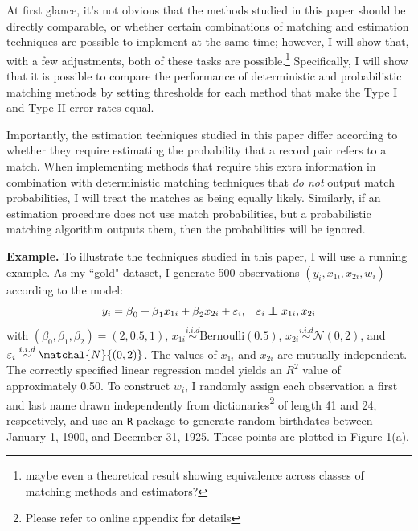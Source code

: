 \documentclass[12pt]{article}
\newcommand\independent{\protect\mathpalette{\protect\independenT}{\perp}}
\def\independenT#1#2{\mathrel{\rlap{$#1#2$}\mkern2mu{#1#2}}}
\begin{document}
At first glance, it's not obvious that the methods studied in this paper should be directly comparable, or whether certain combinations of matching and estimation techniques are possible to implement at the same time; however, I will show that, with a few adjustments, both of these tasks are possible.\footnote{maybe even a theoretical result showing equivalence across classes of matching methods and estimators?}   Specifically, I will show that it is possible to compare the performance of deterministic and probabilistic matching methods by setting thresholds for each method that make the Type I and Type II error rates equal. 

Importantly, the estimation techniques studied in this paper differ according to whether they require estimating the probability that a record pair refers to a match.  When implementing methods that require this extra information in combination with deterministic matching techniques that \textit{do not} output match probabilities, I will treat the matches as being equally likely.  Similarly, if an estimation procedure does not use match probabilities, but a probabilistic matching algorithm outputs them, then the probabilities will be ignored.  

\textbf{Example.} To illustrate the techniques studied in this paper, I will use a running example.  As my ``gold" dataset, I generate 500 observations $(y_i, x_{1i}, x_{2i}, w_i)$ according to the model:
\begin{equation}
y_i = \beta_0 + \beta_1 x_{1i} + \beta_2 x_{2i} + \varepsilon_i , \hspace{5pt} \  \varepsilon_i \independent x_{1i}, x_{2i} 
\end{equation}
with $(\beta_0, \beta_1, \beta_2) = (2, 0.5, 1)$, $x_{1i} \overset{i.i.d}{\sim} \text{Bernoulli}(0.5)$, $x_{2i} \overset{i.i.d}{\sim} \mathcal{N}(0, 2)$, and $\varepsilon_i \overset{i.i.d}{\sim} \matchal{N}{(0, 2)}$.   The values of $x_{1i}$ and $x_{2i}$ are mutually independent.   The correctly specified linear regression model yields an $R^2$ value of approximately 0.50.  
To construct $w_i$, I randomly assign each observation a first and last name drawn independently from dictionaries\footnote{Please refer to online appendix for details} of length 41 and 24, respectively, and use an \texttt{R} package to generate random birthdates between January 1, 1900, and December 31, 1925.  These points are plotted in Figure 1(a).  
\end{document}
